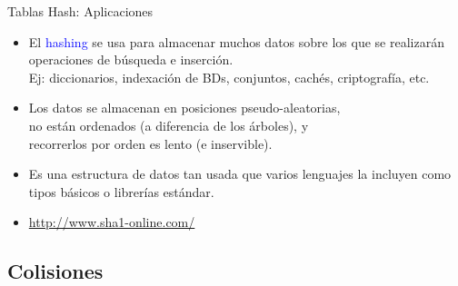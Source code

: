 \documentclass[handout]{beamer} %
\newcommand{\blue}[1]{\textcolor{blue}{#1}}
\begin{document}
\begin{frame}{Tablas Hash: Aplicaciones}
    \begin{itemize}
        \item<1-> El \blue{hashing} se usa para almacenar muchos datos sobre los que se realizarán operaciones de búsqueda e inserción.\\
        {\footnotesize Ej: diccionarios, indexación de BDs, conjuntos, cachés, criptografía, etc.}
        \item<2-> Los datos se almacenan en posiciones pseudo-aleatorias,\\no están ordenados (a diferencia de los árboles), y\\ recorrerlos por orden es lento (e inservible).
        \item<3-> Es una estructura de datos tan usada que varios lenguajes la incluyen como tipos básicos o librerías estándar.
        \item<4-> \blue{\url{http://www.sha1-online.com/}}
    \end{itemize}
\end{frame}

\subsection{Colisiones}
\end{document}
